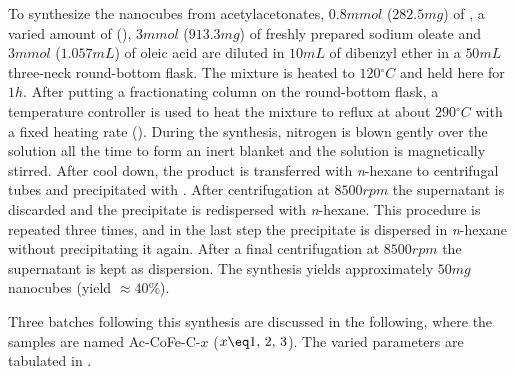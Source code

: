 \documentclass[\main/dresen_thesis.tex]{subfiles}
\begin{document}
    To synthesize the nanocubes from acetylacetonates, $0.8 \unit{mmol}$ ($282.5 \unit{mg}$) of , a varied amount of  (), $3 \unit{mmol}$ ($913.3 \unit{mg}$) of freshly prepared sodium oleate and $3 \unit{mmol}$ ($1.057 \unit{mL}$) of oleic acid are diluted in $10 \unit{mL}$ of dibenzyl ether in a $50 \unit{mL}$ three-neck round-bottom flask.
    The mixture is heated to $120 \unit{^\circ C}$ and held here for $1 \unit{h}$.
    After putting a fractionating column on the round-bottom flask, a temperature controller is used to heat the mixture to reflux at about $290 \unit{^\circ C}$ with a fixed heating rate ().
    During the synthesis, nitrogen is blown gently over the solution all the time to form an inert blanket and the solution is magnetically stirred.
    After cool down, the product is transferred with \textit{n}-hexane to centrifugal tubes and precipitated with .
    After centrifugation at $8500 \unit{rpm}$ the supernatant is discarded and the precipitate is redispersed with \textit{n}-hexane.
    This procedure is repeated three times, and in the last step the precipitate is dispersed in \textit{n}-hexane without precipitating it again.
    After a final centrifugation at $8500 \unit{rpm}$ the supernatant is kept as dispersion.
    The synthesis yields approximately $50 \unit{mg}$ nanocubes (yield $\approx 40 \%$).

    Three batches following this synthesis are discussed in the following, where the samples are named Ac-CoFe-C-$x$ ($x \eq 1,\, 2,\, 3$). The varied parameters are tabulated in .
\end{document}
